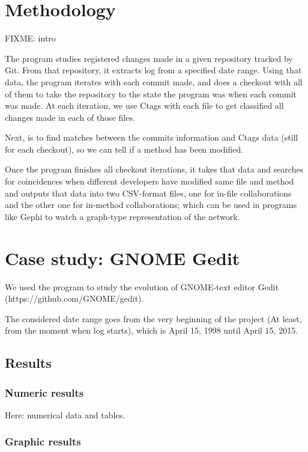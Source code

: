 \documentclass[a4paper]{article}
\begin{document}
\section{Methodology}

FIXME: intro

The program studies registered changes made in a given repository tracked by
Git. From that repository, it extracts log from a specified date range. Using
that data, the program iterates with each commit made, and does a checkout
with all of them to take the repository to the state the program was when each
commit was made. At each iteration, we use Ctags with each file to get
classified all changes made in each of those files.

Next, is to find matches
between the commits information and Ctags data (still for each checkout), so
we can tell if a method has been modified.

Once the program finishes all checkout iterations, it takes that data and
searches for coincidences when different developers have modified same file
and method and outputs that data into two CSV-format files, one for in-file
collaborations and the other one for in-method collaborations; which can be
used in programs like Gephi to watch a graph-type representation of the
network.

\section{Case study: GNOME Gedit}

We used the program to study the evolution of GNOME-text editor Gedit (https://github.com/GNOME/gedit).

The considered date range goes from the very beginning of the project (At
least, from the moment when log starts), which is April 15, 1998 until April
15, 2015.

\subsection{Results}

\subsubsection{Numeric results}

Here: numerical data and tables.

\subsubsection{Graphic results}
\end{document}
